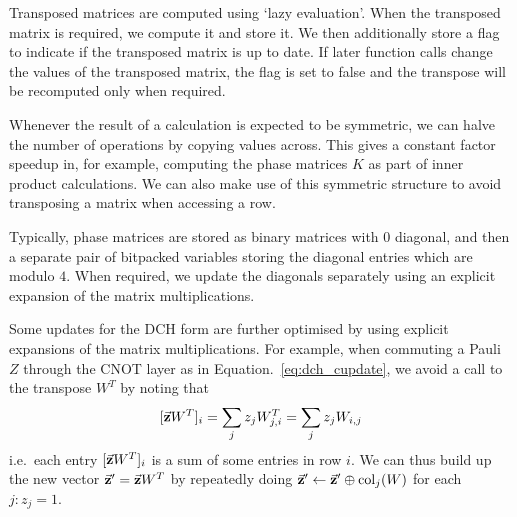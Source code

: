 Transposed matrices are computed using `lazy evaluation'. When the transposed matrix is required, we compute it and store it. We then additionally store a flag to indicate if the transposed matrix is up to date. If later function calls change the values of the transposed matrix, the flag is set to false and the transpose will be recomputed only when required.\par
Whenever the result of a calculation is expected to be symmetric, we can halve the number of operations by copying values across. This gives a constant factor speedup in, for example, computing the phase matrices $K$ as part of inner product calculations. We can also make use of this symmetric structure to avoid transposing a matrix when accessing a row.\par
Typically, phase matrices are stored as binary matrices with $0$ diagonal, and then a separate pair of bitpacked variables storing the diagonal entries which are modulo $4$. When required, we update the diagonals separately using an explicit expansion of the matrix multiplications.\par
Some updates for the DCH form are further optimised by using explicit expansions of the matrix multiplications. For example, when commuting a Pauli $Z$ through the CNOT layer as in Equation.~\ref{eq:dch_cupdate}, we avoid a call to the transpose $W^{T}$ by noting that
\[[\va{z}W^{T}]_{i} = \sum_{j}z_{j}W^{T}_{j,i}=\sum_{j}z_{j}W_{i,j} \]
i.e.\ each entry $[\va{z}W^{T}]_{i}$ is a sum of some entries in row $i$. We can thus build up the new vector $\va{z}'=\va{z}W^{T}$ by repeatedly doing $\va{z}'\gets \va{z}' \oplus \text{col}_{j}(W)$ for each $j:z_{j}=1$.
